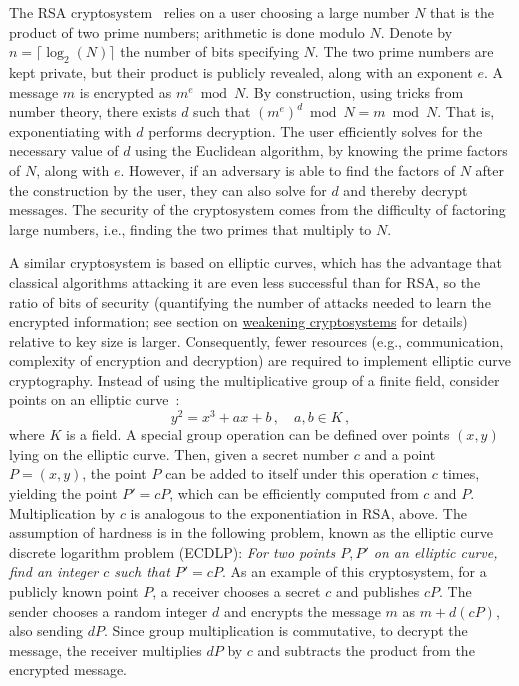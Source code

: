 \begin{refsection}
The RSA cryptosystem~\cite{rivest1978RSA} relies on a user choosing a large number $N$ that is the product of two prime numbers; arithmetic is done modulo $N$. Denote by $n=\lceil \log_2(N) \rceil$ the number of bits specifying $N$. The two prime numbers are kept private, but their product is publicly revealed, along with an exponent $e$. A message $m$ is encrypted as $m^e \bmod N$. By construction, using tricks from number theory, there exists $d$ such that $(m^e)^d \bmod N = m \bmod N$. That is, exponentiating with $d$ performs decryption. The user efficiently solves for the necessary value of $d$ using the Euclidean algorithm, by knowing the prime factors of $N$, along with $e$. However, if an adversary is able to find the factors of $N$ after the construction by the user, they can also solve for $d$ and thereby decrypt messages. The security of the cryptosystem comes from the difficulty of factoring large numbers, i.e., finding the two primes that multiply to $N$. 

A similar cryptosystem is based on elliptic curves, which has the advantage that classical algorithms attacking it are even less successful than for RSA, so the ratio of bits of security (quantifying the number of attacks needed to learn the encrypted information; see section on \hyperref[appl:WeakeningCrypto]{weakening cryptosystems} for details) relative to key size is larger. Consequently, fewer resources (e.g., communication, complexity of encryption and decryption) are required to implement elliptic curve cryptography. Instead of using the multiplicative group of a finite field, consider points on an elliptic curve~\cite{koblitz1987ECC,miller1986ECC}:
\begin{equation}
y^2=x^3+ax+b\,,\quad a,b\in K\,,
\end{equation}
where $K$ is a field. A special group operation can be defined over points $(x,y)$ lying on the elliptic curve. Then, given a secret number $c$ and a point $P = (x,y)$, the point $P$ can be added to itself under this operation $c$ times, yielding the point $P'=cP$, which can be efficiently computed from $c$ and $P$.
Multiplication by $c$ is analogous to the exponentiation in RSA, above. The assumption of hardness is in the following problem, known as the elliptic curve discrete logarithm problem (ECDLP): \emph{For two points $P,P'$ on an elliptic curve, find an integer $c$ such that $P'=cP$}. As an example of this cryptosystem, for a publicly known point $P$, a receiver chooses a secret $c$ and publishes $cP$. The sender chooses a random integer $d$ and encrypts the message $m$ as $m+ d(cP)$, also sending $dP$. Since group multiplication is commutative, to decrypt the message, the receiver multiplies $dP$ by $c$ and subtracts the product from the encrypted message.


\end{refsection}
